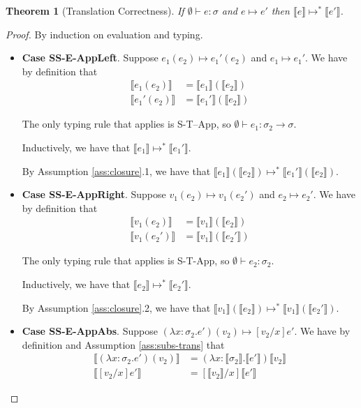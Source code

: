 \documentclass[11pt,leqno]{article}
\newtheorem{thm}{Theorem}
\theoremstyle{definition}
\newcommand{\trden}[1]{\llbracket #1 \rrbracket} %
\begin{document}
\begin{thm}[Translation Correctness]
If $\emptyset \vdash e : \sigma$ and $e \mapsto e'$ then $\trden{e} \mapsto^* \trden{e'}$.
\end{thm}
\begin{proof}
By induction on evaluation and typing.

\begin{itemize}[label=$ $,itemsep=1ex]

\item \textbf{Case SS-E-AppLeft}. 
Suppose $e_1(e_2) \mapsto e_1'(e_2)$ and $e_1 \mapsto e_1'$. We have by definition that
\begin{align*}
    \trden{e_1(e_2)} &= \trden{e_1}(\trden{e_2})\\
    \trden{e_1'(e_2)} &= \trden{e_1'}(\trden{e_2})
\end{align*}

The only typing rule that applies is S-T--App, so $\emptyset \vdash e_1 : \sigma_2 \rightarrow \sigma$.

Inductively, we have that $\trden{e_1} \mapsto^{*} \trden{e_1'}$.

By Assumption \ref{ass:closure}.1, we have that $\trden{e_1}(\trden{e_2}) \mapsto^{*} \trden{e_1'}(\trden{e_2})$.

\item \textbf{Case SS-E-AppRight}.
Suppose $v_1(e_2) \mapsto v_1(e_2')$ and $e_2 \mapsto e_2'$. We have by definition that
\begin{align*}
  \trden{v_1(e_2)} &= \trden{v_1}(\trden{e_2})\\
  \trden{v_1(e_2')} &= \trden{v_1}(\trden{e_2'})
\end{align*}

The only typing rule that applies is S-T-App, so $\emptyset \vdash e_2 : \sigma_2$.

Inductively, we have that $\trden{e_2} \mapsto^* \trden{e_2'}$.

By Assumption \ref{ass:closure}.2, we have that $\trden{v_1}(\trden{e_2}) \mapsto^* \trden{v_1}(\trden{e_2'})$.

\item \textbf{Case SS-E-AppAbs}.
Suppose $(\lambda x : \sigma_2 . e')(v_2) \mapsto [v_2/x]e'$.
We have by definition and Assumption \ref{ass:subs-trans} that
\begin{align*}
  \trden{(\lambda x : \sigma_2. e')(v_2)} &= (\lambda x : \trden{\sigma_2}. \trden{e'})\trden{v_2}\\
  \trden{[v_2/x]e'}&= [\trden{v_2}/x]\trden{e'}
\end{align*}


\end{itemize}
\end{proof}
\end{document}
